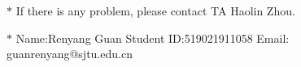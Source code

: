 \documentclass[12pt,a4paper]{article}
\theoremstyle{definition}
\begin{document}
	\noindent
	
	\noindent{}
	\begin{center}
		\footnotesize{\color{red}$*$ If there is any problem, please contact TA Haolin Zhou.}
		
		\footnotesize{\color{blue}$*$ Name:Renyang Guan  \quad Student ID:519021911058 \quad Email: guanrenyang@sjtu.edu.cn}
		
	\end{center}
	
\end{document}
